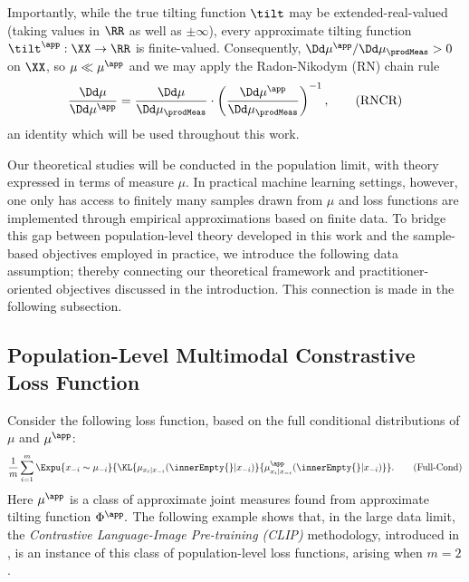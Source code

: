 \documentclass{article}
\begin{document}
Importantly, while the true tilting function $\tilt$ may be
extended-real-valued (taking values in $\RR$ as well as $\pm \infty$),
every approximate tilting function
$\tilt^\app:\XX\to\RR$ is finite-valued. Consequently,
$\Dd\mu^\app/\Dd\mu_\prodMeas>0$ on $\XX$, so
$\mu\ll\mu^\app$ and we may apply the Radon-Nikodym (RN) chain rule
\begin{align}
 \frac{\Dd \mu}{\Dd \mu^\app} = \frac{\Dd \mu}{\Dd \mu_\prodMeas}
 \cdot \left(\frac{\Dd \mu^\app}{\Dd \mu_\prodMeas}\right)^{-1},
 \label{eq:RadonNikodymChainRule}
 \tag{RNCR}
\end{align}
an identity which will be used throughout this work.

Our theoretical studies will be conducted in the population limit, with
theory expressed in terms of measure $\mu$. In practical machine learning
settings, however, one only has access to finitely many samples drawn from
$\mu$ and loss functions are implemented through empirical approximations
based on finite data. To bridge this gap between population-level theory
developed in this work and the sample-based objectives employed in
practice, we introduce the following data assumption; thereby connecting
our theoretical framework and practitioner-oriented objectives discussed in
the introduction. This connection is made in the following subsection.


\subsection{Population-Level Multimodal Constrastive Loss Function}
\label{subsec:BCME}

Consider the following loss function, based on the full conditional
distributions of $\mu$ and $\mu^\app$:
\begin{equation}
 \frac{1}{m} \sum_{i=1}^{m}
 \Expu{x_{-i}\sim \mu_{-i}}{\KL{\mu_{x_i\vert x_{-i}}(\innerEmpty{}\vert x_{-i})}{
   \mu^\app_{x_i\vert x_{-i}}(\innerEmpty{}\vert x_{-i})
  }}.
 \tag{Full-Cond}
 \label{eq:plcl}
\end{equation}
Here $\mu^\app$ is a class of approximate joint measures found from
approximate tilting function $\Phi^\app.$ The following example shows that,
in the large data limit, the
\emph{Contrastive Language-Image Pre-training (CLIP)} methodology,
introduced in \cite{radfordLearningTransferableVisual2021}, is an instance of this
class of population-level loss functions, arising when $m=2$.
\end{document}
